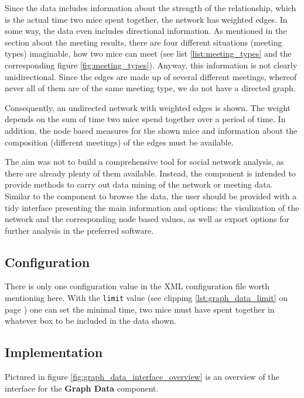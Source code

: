 Since the data includes information about the strength of the relationship, which is the actual time two mice spent together, the network has weighted edges. In some way, the data even includes directional information. As mentioned in the section about the meeting results, there are four different situations (meeting types) imaginable, how two mice can meet (see list \ref{list:meeting_types} and the corresponding figure \ref{fig:meeting_types}). Anyway, this information is not clearly unidirectional. Since the edges are made up of several different meetings, whereof never all of them are of the same meeting type, we do not have a directed graph.

Consequently, an undirected network with weighted edges is shown. The weight depends on the sum of time two mice spend together over a period of time. In addition, the node based measures for the shown mice and information about the composition (different meetings) of the edges must be available.

The aim was not to build a comprehensive tool for social network analysis, as there are already plenty of them available. Instead, the component is intended to provide methods to carry out data mining of the network or meeting data. Similar to the component to browse the data, the user should be provided with a tidy interface presenting the main information and options: the visulization of the network and the corresponding node based values, as well as export options for further analysis in the preferred software.

\subsection{Configuration}
\label{subsec:graph_explore}

There is only one configuration value in the XML configuration file worth mentioning here. With the \lstinline|limit| value (see clipping \ref{lst:graph_data_limit} on page \pageref{lst:graph_data_limit}) one can set the minimal time, two mice must have spent together in whatever box to be included in the data shown. 

\subsection{Implementation}
\label{subsec:graph_explore}

Pictured in figure \ref{fig:graph_data_interface_overview} is an overview of the interface for the \textbf{Graph Data} component. 

